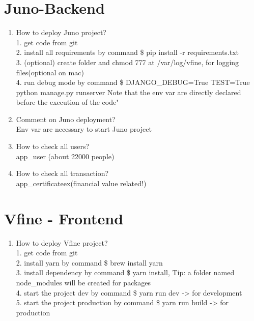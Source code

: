 \documentclass[10pt,a4paper,oneside]{article}
\begin{document}
\section{Juno-Backend}
\begin{enumerate}[1.]
\item   How to deploy Juno project?    \\
1. get code from git \\2. install all requirements by command \$ pip install -r requirements.txt \\3. (optional) create folder and chmod 777 at /var/log/vfine, for logging files(optional on mac) \\4. run debug mode by command \$ DJANGO\_DEBUG=True TEST=True python manage.py runserver Note that the env var are directly declared before the execution of the code"
\item   Comment on Juno deployment?    \\
Env var are necessary to start Juno project
\item    How to check all users?   \\
app\_user (about 22000 people)
\item     How to check all transaction?  \\
app\_certificateex(financial value related!)
\end{enumerate}

\section{Vfine - Frontend}
\begin{enumerate}[1.]
\item  How to deploy Vfine project?     \\
1. get code from git\\
2. install yarn by command \$ brew install yarn\\
3. install dependency by command \$ yarn install, Tip: a folder named node\_modules will be created for packages\\
4. start the project dev by command \$ yarn run dev -> for development\\
5. start the project production by command \$ yarn run build -> for production
\end{enumerate}
\end{document}
